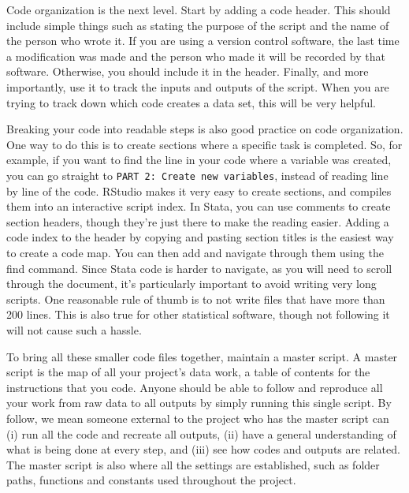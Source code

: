 Code organization is the next level.
Start by adding a code header.
This should include simple things such as stating the purpose of the script and the name of the person who wrote it.
If you are using a version control software,
the last time a modification was made and the person who made it will be recorded by that software.
Otherwise, you should include it in the header.
Finally, and more importantly, use it to track the inputs and outputs of the script.
When you are trying to track down which code creates a data set, this will be very helpful.

Breaking your code into readable steps is also good practice on code organization.
One way to do this is to create sections where a specific task is completed.
So, for example, if you want to find the line in your code where a variable was created,
you can go straight to \texttt{PART 2: Create new variables},
instead of reading line by line of the code.
RStudio makes it very easy to create sections, and compiles them into an interactive script index.
In Stata, you can use comments to create section headers,
though they're just there to make the reading easier.
Adding a code index to the header by copying and pasting section titles is the easiest way to create a code map.
You can then add and navigate through them using the find command.
Since Stata code is harder to navigate, as you will need to scroll through the document,
it's particularly important to avoid writing very long scripts.
One reasonable rule of thumb is to not write files that have more than 200 lines.
This is also true for other statistical software,
though not following it will not cause such a hassle.


To bring all these smaller code files together, maintain a master script.
A master script is the map of all your project's data work,
a table of contents for the instructions that you code.
Anyone should be able to follow and reproduce all your work from
raw data to all outputs by simply running this single script.
By follow, we mean someone external to the project who has the master script can
(i) run all the code and recreate all outputs,
(ii) have a general understanding of what is being done at every step, and
(iii) see how codes and outputs are related.
The master script is also where all the settings are established,
such as folder paths, functions and constants used throughout the project.

